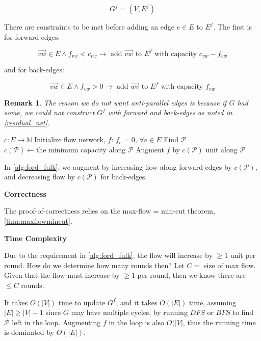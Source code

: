 \documentclass{article}
\newtheorem{remark}{Remark}
\theoremstyle{definition}
\begin{document}
$$G^f = (V, E^f)$$

There are constraints to be met before adding an edge $e \in E$ to $E^f$. The first is for forward edges:

$$\overrightarrow{vw} \in E \land f_{vw} < c_{vw} \to \text{ add } \overrightarrow{vw} \text { to } E^f \text { with capacity } c_{vw} - f_{vw}$$

and for back-edges:

$$\overrightarrow{vw} \in E \land f_{vw} > 0 \to \text{ add } \overrightarrow{wv} \text { to } E^f \text { with capacity } f_{vw}$$

\begin{remark}
The reason we do not want anti-parallel edges is because if $G$ had some, we could not construct $G^f$ with forward and back-edges as noted in \ref{residual_net}.
\end{remark}

\begin{algorithm}[H]
\caption{$FordFulkerson$}
\label{alg:ford_fulk}
\begin{algorithmic}[1]
	\REQUIRE $c : E \to \mathbb{N}$ 
	\STATE Initialize flow network, $f$: $f_e = 0, \, \forall e \in E$
		\STATE Find $\mathcal{P}$
		\STATE $c(\mathcal{P}) \gets \text{the minimum capacity along } \mathcal{P}$
		\STATE Augment $f$ by $c(\mathcal{P})$ unit along $\mathcal{P}$
	\ENDWHILE
\end{algorithmic}
\end{algorithm}

In \ref{alg:ford_fulk}, we augment by increasing flow along forward edges by $c(\mathcal{P})$, and decreasing flow by $c(\mathcal{P})$ for back-edges. 

\textbf{Correctness}

The proof-of-correctness relies on the max-flow = min-cut theorem, \ref{thm:maxflowmincut}. 

\textbf{Time Complexity}

Due to the requirement in \ref{alg:ford_fulk}, the flow will increase by $\geq 1$ unit per round. How do we determine how many rounds then? Let $C=$ size of max flow. Given that the flow must increase by $\geq 1$ per round, then we know there are $\leq C$ rounds. 

It takes $O(|V|)$ time to update $G^f$, and it takes $O(|E|)$ time, assuming $|E| \geq |V|-1$ since $G$ may have multiple cycles, by running $DFS$ or $BFS$ to find $\mathcal{P}$ left in the loop. Augmenting $f$ in the loop is also $O(|V|$, thus the running time is dominated by $O(|E|)$. 
\end{document}

